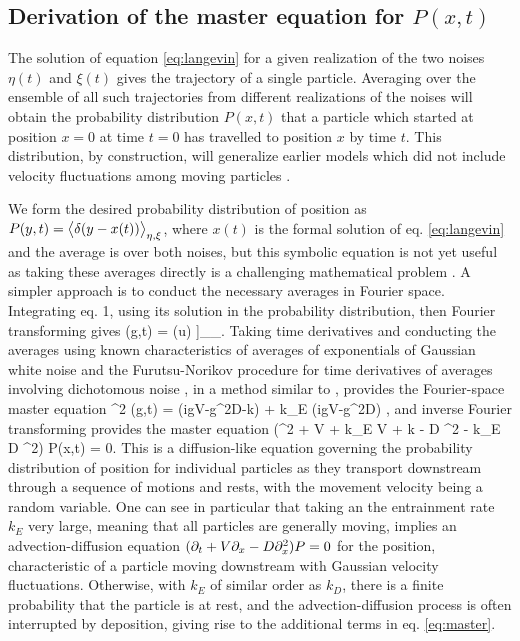 \subsection{Derivation of the master equation for $P(x,t)$}
The solution of equation \ref{eq:langevin} for a given realization of the two noises $\eta(t)$ and $\xi(t)$ gives the trajectory of a single particle. Averaging over the ensemble of all such trajectories from different realizations of the noises will obtain the probability distribution $P(x,t)$ that a particle which started at position $x=0$ at time $t=0$ has travelled to position $x$ by time $t$. This distribution, by construction, will generalize earlier models which did not include velocity fluctuations among moving particles \citep{Lisle1998,Lajeunesse2017}.

We form the desired probability distribution of position as $ P(y,t) = \big\langle \delta(y-x(t))\big\rangle_{\eta,\xi} $, where $x(t)$ is the formal solution of eq. \ref{eq:langevin} and the average is over both noises, but this symbolic equation is not yet useful as taking these averages directly is a challenging mathematical problem \citep{Hanggi1978}.
A simpler approach is to conduct the necessary averages in Fourier space. Integrating eq. 1, using its solution in the probability distribution, then Fourier transforming gives
\be {}(g,t) = \Big\bra  \Big\bra \exp \Big[- i g \int_0^t du [V+\sqrt{2D}\xi(u)]\eta(u) \Big]\Big\ket_\eta \Big\ket_\xi.\ee
Taking time derivatives and conducting the averages using known characteristics of averages of exponentials of Gaussian white noise \citep{Gardiner1983,VanKampen1978} and the Furutsu-Norikov procedure for time derivatives of averages involving dichotomous noise \citep{Loginov1978}, in a method similar to \citep{Balakrishnan1993}, provides the Fourier-space master equation
\be \pt^2 (g,t)  = (igV-g^2D-k)\pt  {} + k_E (igV-g^2D) ,\ee
and inverse Fourier transforming provides the master equation
\be (\pt^2 + V \px \pt + k_E V \px + k \pt - D \px^2 \pt - k_E D \px^2) P(x,t) = 0. \label{eq:master}\ee
This is a diffusion-like equation governing the probability distribution of position for individual particles as they transport downstream through a sequence of motions and rests, with the movement velocity being a random variable.
One can see in particular that taking an the entrainment rate $k_E$ very large, meaning that all particles are generally moving, implies an advection-diffusion equation $(\partial_t + V\partial_x -D \partial_x^2)P=0$ for the position, characteristic of a particle moving downstream with Gaussian velocity fluctuations. Otherwise, with $k_E$ of similar order as $k_D$, there is a finite probability that the particle is at rest, and the advection-diffusion process is often interrupted by deposition, giving rise to the additional terms in eq. \ref{eq:master}.
